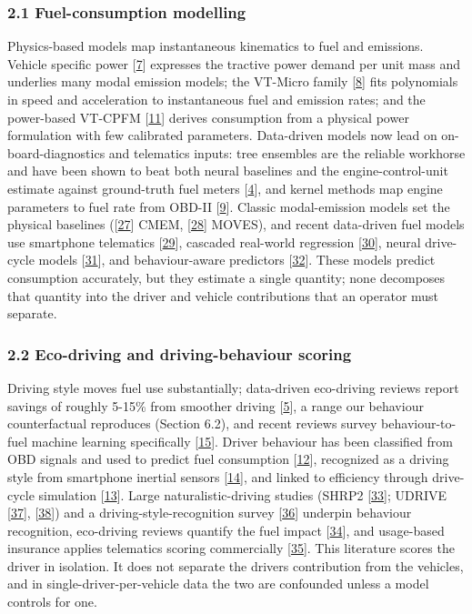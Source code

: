 \subsubsection{2.1 Fuel-consumption
modelling}\label{fuel-consumption-modelling}

Physics-based models map instantaneous kinematics to fuel and emissions.
Vehicle specific power {[}\hyperref[r7]{7}{]} expresses the tractive
power demand per unit mass and underlies many modal emission models; the
VT-Micro family {[}\hyperref[r8]{8}{]} fits polynomials in speed and
acceleration to instantaneous fuel and emission rates; and the
power-based VT-CPFM {[}\hyperref[r11]{11}{]} derives consumption from a
physical power formulation with few calibrated parameters. Data-driven
models now lead on on-board-diagnostics and telematics inputs: tree
ensembles are the reliable workhorse and have been shown to beat both
neural baselines and the engine-control-unit estimate against
ground-truth fuel meters {[}\hyperref[r4]{4}{]}, and kernel methods map
engine parameters to fuel rate from OBD-II {[}\hyperref[r9]{9}{]}.
Classic modal-emission models set the physical baselines
({[}\hyperref[r27]{27}{]} CMEM, {[}\hyperref[r28]{28}{]} MOVES), and
recent data-driven fuel models use smartphone telematics
{[}\hyperref[r29]{29}{]}, cascaded real-world regression
{[}\hyperref[r30]{30}{]}, neural drive-cycle models
{[}\hyperref[r31]{31}{]}, and behaviour-aware predictors
{[}\hyperref[r32]{32}{]}. These models predict consumption accurately,
but they estimate a single quantity; none decomposes that quantity into
the driver and vehicle contributions that an operator must separate.

\subsubsection{2.2 Eco-driving and driving-behaviour
scoring}\label{eco-driving-and-driving-behaviour-scoring}

Driving style moves fuel use substantially; data-driven eco-driving
reviews report savings of roughly 5-15\% from smoother driving
{[}\hyperref[r5]{5}{]}, a range our behaviour counterfactual reproduces
(Section 6.2), and recent reviews survey behaviour-to-fuel machine
learning specifically {[}\hyperref[r15]{15}{]}. Driver behaviour has
been classified from OBD signals and used to predict fuel consumption
{[}\hyperref[r12]{12}{]}, recognized as a driving style from smartphone
inertial sensors {[}\hyperref[r14]{14}{]}, and linked to efficiency
through drive-cycle simulation {[}\hyperref[r13]{13}{]}. Large
naturalistic-driving studies (SHRP2 {[}\hyperref[r33]{33}{]}; UDRIVE
{[}\hyperref[r37]{37}{]}, {[}\hyperref[r38]{38}{]}) and a
driving-style-recognition survey {[}\hyperref[r36]{36}{]} underpin
behaviour recognition, eco-driving reviews quantify the fuel impact
{[}\hyperref[r34]{34}{]}, and usage-based insurance applies telematics
scoring commercially {[}\hyperref[r35]{35}{]}. This literature scores
the driver in isolation. It does not separate the
driver\textquotesingle s contribution from the
vehicle\textquotesingle s, and in single-driver-per-vehicle data the two
are confounded unless a model controls for one.

